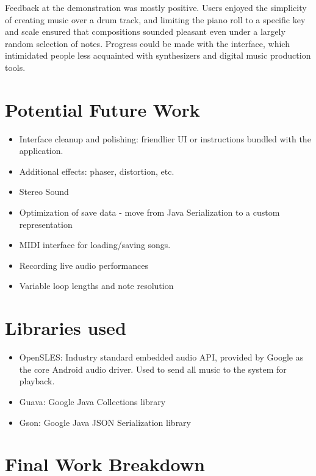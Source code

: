 \documentclass[letterpaper,12pt]{article}
\begin{document}
Feedback at the demonstration was mostly positive. Users enjoyed the simplicity of creating music over a drum track, and limiting the piano roll to a specific key and scale ensured that compositions sounded pleasant even under a largely random selection of notes. Progress could be made with the interface, which intimidated people less acquainted with synthesizers and digital music production tools. 

\section{Potential Future Work}
\begin{itemize}
  \item Interface cleanup and polishing: friendlier UI or instructions bundled with the application. 
  \item Additional effects: phaser, distortion, etc.
  \item Stereo Sound
  \item Optimization of save data - move from Java Serialization to a custom representation
  \item MIDI interface for loading/saving songs.
  \item Recording live audio performances
  \item Variable loop lengths and note resolution
\end{itemize}

\section{Libraries used}
\begin{itemize}
    \item OpenSLES: Industry standard embedded audio API, provided by Google as the core Android audio driver. Used to send all music to the system for playback. \cite{opensles}
    \item Guava: Google Java Collections library \cite{guava}
    \item Gson: Google Java JSON Serialization library \cite{gson}
\end{itemize}



\clearpage
\section*{Final Work Breakdown}
\end{document}
